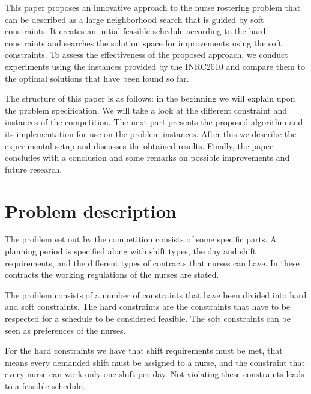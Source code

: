 \documentclass{article}
\begin{document}
This paper proposes an innovative approach to the nurse rostering problem that can be described as a large neighborhood search that is guided by soft constraints.
It creates an initial feasible schedule according to the hard constraints and searches the solution space for improvements using the soft constraints.
To assess the effectiveness of the proposed approach, we conduct experiments using the instances provided by the INRC2010 and compare them to the optimal solutions that have been found so far. 

The structure of this paper is as follows: in the beginning we will explain upon the problem specification.
We will take a look at the different constraint and instances of the competition.
The next part presents the proposed algorithm and its implementation for use on the problem instances.
After this we describe the experimental setup and discusses the obtained results.
Finally, the paper concludes with a conclusion and some remarks on possible improvements and future research.

\section{Problem description}
The problem set out by the competition consists of some specific parts.
A planning period is specified along with shift types, the day and shift requirements, and the different types of contracts that nurses can have.
In these contracts the working regulations of the nurses are stated.

The problem consists of a number of constraints that have been divided into hard and soft constraints.
The hard constraints are the constraints that have to be respected for a schedule to be considered feasible.
The soft constraints can be seen as preferences of the nurses.

For the hard constraints we have that shift requirements must be met, that means every demanded shift must be assigned to a nurse, and the constraint that every nurse can work only one shift per day.
Not violating these constraints leads to a feasible schedule.
\end{document}
